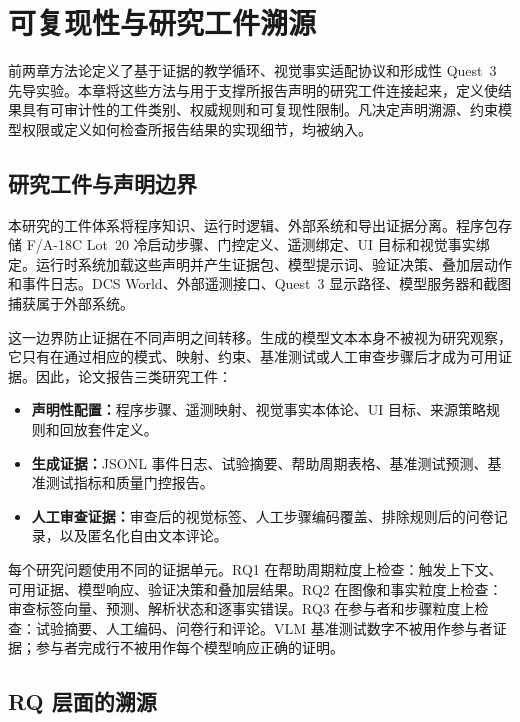 %
\chapter{可复现性与研究工件溯源}\label{ch:implementation}

前两章方法论定义了基于证据的教学循环、视觉事实适配协议和形成性 Quest~3 先导实验。本章将这些方法与用于支撑所报告声明的研究工件连接起来，定义使结果具有可审计性的工件类别、权威规则和可复现性限制。凡决定声明溯源、约束模型权限或定义如何检查所报告结果的实现细节，均被纳入。

\section{研究工件与声明边界}\label{sec:impl-boundaries}

本研究的工件体系将程序知识、运行时逻辑、外部系统和导出证据分离。程序包存储 F/A-18C Lot~20 冷启动步骤、门控定义、遥测绑定、UI 目标和视觉事实绑定。运行时系统加载这些声明并产生证据包、模型提示词、验证决策、叠加层动作和事件日志。DCS World、外部遥测接口、Quest~3 显示路径、模型服务器和截图捕获属于外部系统。

这一边界防止证据在不同声明之间转移。生成的模型文本本身不被视为研究观察，它只有在通过相应的模式、映射、约束、基准测试或人工审查步骤后才成为可用证据。因此，论文报告三类研究工件：

\begin{itemize}
\item \textbf{声明性配置：}程序步骤、遥测映射、视觉事实本体论、UI 目标、来源策略规则和回放套件定义。
\item \textbf{生成证据：}JSONL 事件日志、试验摘要、帮助周期表格、基准测试预测、基准测试指标和质量门控报告。
\item \textbf{人工审查证据：}审查后的视觉标签、人工步骤编码覆盖、排除规则后的问卷记录，以及匿名化自由文本评论。
\end{itemize}

每个研究问题使用不同的证据单元。RQ1 在帮助周期粒度上检查：触发上下文、可用证据、模型响应、验证决策和叠加层结果。RQ2 在图像和事实粒度上检查：审查标签向量、预测、解析状态和逐事实错误。RQ3 在参与者和步骤粒度上检查：试验摘要、人工编码、问卷行和评论。VLM 基准测试数字不被用作参与者证据；参与者完成行不被用作每个模型响应正确的证明。

\section{RQ 层面的溯源}\label{sec:impl-provenance}

